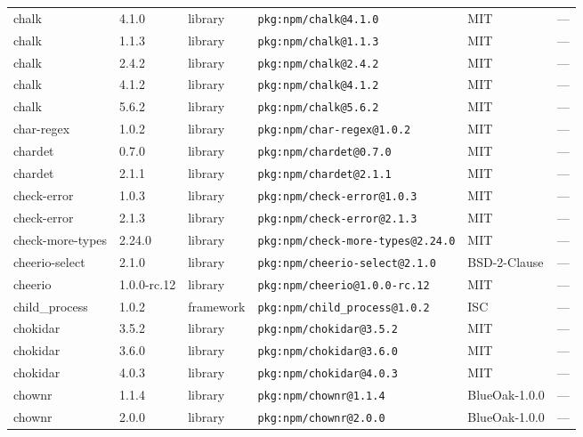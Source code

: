 \documentclass[11pt,a4paper]{article}
\begin{document}
\begin{longtable}{|p{4cm}|p{2cm}|p{1.6cm}|p{5cm}|p{1.5cm}|p{3.5cm}|}
\raggedright chalk & 4.1.0 & library & \small\texttt{pkg:npm/chalk@4.1.0} & MIT & \small — \\
\raggedright chalk & 1.1.3 & library & \small\texttt{pkg:npm/chalk@1.1.3} & MIT & \small — \\
\raggedright chalk & 2.4.2 & library & \small\texttt{pkg:npm/chalk@2.4.2} & MIT & \small — \\
\raggedright chalk & 4.1.2 & library & \small\texttt{pkg:npm/chalk@4.1.2} & MIT & \small — \\
\raggedright chalk & 5.6.2 & library & \small\texttt{pkg:npm/chalk@5.6.2} & MIT & \small — \\
\raggedright char-regex & 1.0.2 & library & \small\texttt{pkg:npm/char-regex@1.0.2} & MIT & \small — \\
\raggedright chardet & 0.7.0 & library & \small\texttt{pkg:npm/chardet@0.7.0} & MIT & \small — \\
\raggedright chardet & 2.1.1 & library & \small\texttt{pkg:npm/chardet@2.1.1} & MIT & \small — \\
\raggedright check-error & 1.0.3 & library & \small\texttt{pkg:npm/check-error@1.0.3} & MIT & \small — \\
\raggedright check-error & 2.1.3 & library & \small\texttt{pkg:npm/check-error@2.1.3} & MIT & \small — \\
\raggedright check-more-types & 2.24.0 & library & \small\texttt{pkg:npm/check-more-types@2.24.0} & MIT & \small — \\
\raggedright cheerio-select & 2.1.0 & library & \small\texttt{pkg:npm/cheerio-select@2.1.0} & BSD-2-Clause & \small — \\
\raggedright cheerio & 1.0.0-rc.12 & library & \small\texttt{pkg:npm/cheerio@1.0.0-rc.12} & MIT & \small — \\
\raggedright child\_process & 1.0.2 & framework & \small\texttt{pkg:npm/child\_process@1.0.2} & ISC & \small — \\
\raggedright chokidar & 3.5.2 & library & \small\texttt{pkg:npm/chokidar@3.5.2} & MIT & \small — \\
\raggedright chokidar & 3.6.0 & library & \small\texttt{pkg:npm/chokidar@3.6.0} & MIT & \small — \\
\raggedright chokidar & 4.0.3 & library & \small\texttt{pkg:npm/chokidar@4.0.3} & MIT & \small — \\
\raggedright chownr & 1.1.4 & library & \small\texttt{pkg:npm/chownr@1.1.4} & BlueOak-1.0.0 & \small — \\
\raggedright chownr & 2.0.0 & library & \small\texttt{pkg:npm/chownr@2.0.0} & BlueOak-1.0.0 & \small — \\

\end{longtable}
\end{document}
